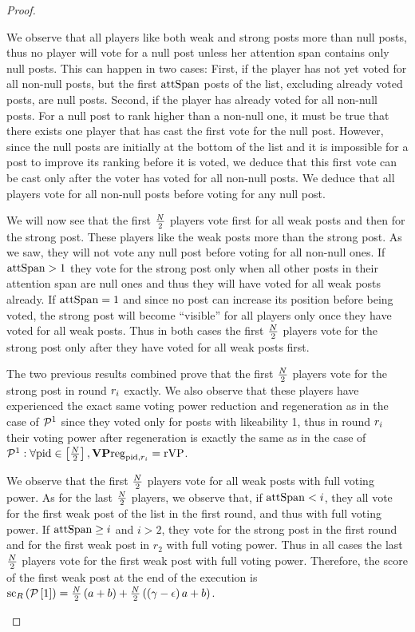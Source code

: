 \begin{proof}
\begin{itemize}
    We observe that all players like both weak and strong posts more than null
    posts, thus no player will vote for a null post unless her attention span
    contains only null posts. This can happen in two cases: First, if the player
    has not yet voted for all non-null posts, but the first $\mathrm{attSpan}$ posts of
    the list, excluding already voted posts, are null posts. Second, if the
    player has already voted for all non-null posts. For a null post to rank
    higher than a non-null one, it must be true that there exists one player
    that has cast the first vote for the null post. However, since the null
    posts are initially at the bottom of the list and it is impossible for a
    post to improve its ranking before it is voted, we deduce that this first
    vote can be cast only after the voter has voted for all non-null posts. We
    deduce that all players vote for all non-null posts before voting for any
    null post.

    We will now see that the first $\frac{N}{2}$ players vote first for
    all weak posts and then for the strong post. These players like the weak
    posts more than the strong post. As we saw, they will not vote any null
    post before voting for all non-null ones. If $\mathrm{attSpan} > 1$ they vote for
    the strong post only when all other posts in their attention span are null
    ones and thus they will have voted for all weak posts already. If $\mathrm{attSpan}
    = 1$ and since no post can increase its position before being voted, the
    strong post will become ``visible'' for all players only once they have
    voted for all weak posts. Thus in both cases the first
    $\frac{N}{2}$ players vote for the strong post only after they have
    voted for all weak posts first.

    The two previous results combined prove that the first
    $\frac{N}{2}$ players vote for the strong post in round $r_i$
    exactly. We also observe that these players have experienced the exact same
    voting power reduction and regeneration as in the case of $\mathcal{P}^1$
    since they voted only for posts with likeability 1, thus in round $r_i$
    their voting power after regeneration is exactly the same as in the case of
    $\mathcal{P}^1: \forall \mathrm{pid} \in
    \left[\frac{N}{2}\right], \mathrm{\textbf{VP}reg}_{\mathrm{pid}, r_i} =
    \mathrm{rVP}$.

    We observe that the first $\frac{N}{2}$ players vote for all weak
    posts with full voting power. As for the last $\frac{N}{2}$
    players, we observe that, if $\mathrm{attSpan} < i$, they all vote for the first
    weak post of the list in the first round, and thus with full voting power. If
    $\mathrm{attSpan} \geq i$ and $i > 2$, they vote for the strong post in the first
    round and for the first weak post in $r_2$ with full voting power. Thus in
    all cases the last $\frac{N}{2}$ players vote for the first weak
    post with full voting power. Therefore, the score of the first weak post at
    the end of the execution is
    $\mathrm{sc}_{R}\left(\mathcal{P}\left[1\right]\right) =
    \frac{N}{2}\left(a + b\right) +
    \frac{N}{2}\left(\left(\gamma - \epsilon\right) a + b\right)$.


\end{itemize}
\end{proof}
